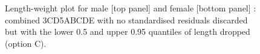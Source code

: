 \begin{figure}[htp]
\captionsetup[subfigure]{labelformat=empty}
\begin{center}
\newline
{}
\end{center}
\caption{Length-weight plot for male [top panel] and female [bottom panel] \fishname: combined 3CD5ABCDE with no standardised residuals discarded but with the lower 0.5 and upper 0.95 quantiles of length dropped (option C).}
\label{fig:lwOptionC}
\end{figure}

